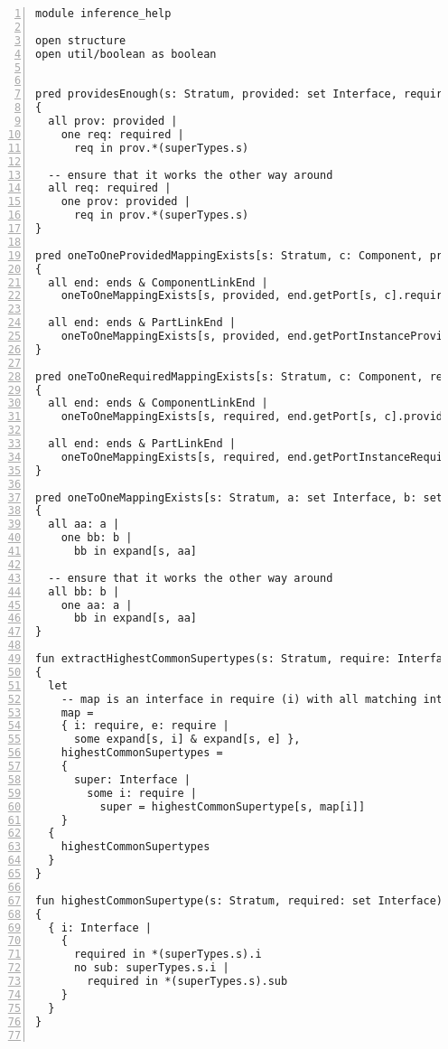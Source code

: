 \lstset{frame=tb, aboveskip=12pt, belowskip=-3pt, breaklines=true, basicstyle=\tiny\ttfamily, tabsize=2, mathescape=true}
\begin{lstlisting}[caption={inference\_help.als}, numbers=left]
module inference_help

open structure
open util/boolean as boolean


pred providesEnough(s: Stratum, provided: set Interface, required: set Interface)
{
  all prov: provided |
    one req: required |
      req in prov.*(superTypes.s)
      
  -- ensure that it works the other way around
  all req: required |
    one prov: provided |
      req in prov.*(superTypes.s)
}

pred oneToOneProvidedMappingExists[s: Stratum, c: Component, provided: set Interface, ends: LinkEnd]
{
  all end: ends & ComponentLinkEnd |
    oneToOneMappingExists[s, provided, end.getPort[s, c].required.c.s]

  all end: ends & PartLinkEnd |
    oneToOneMappingExists[s, provided, end.getPortInstanceProvided[s, c]]
}

pred oneToOneRequiredMappingExists[s: Stratum, c: Component, required: set Interface, ends: LinkEnd]
{
  all end: ends & ComponentLinkEnd |
    oneToOneMappingExists[s, required, end.getPort[s, c].provided.c.s]

  all end: ends & PartLinkEnd |
    oneToOneMappingExists[s, required, end.getPortInstanceRequired[s, c]]
}

pred oneToOneMappingExists[s: Stratum, a: set Interface, b: set Interface]
{
  all aa: a |
    one bb: b |
      bb in expand[s, aa]
      
  -- ensure that it works the other way around
  all bb: b |
    one aa: a |
      bb in expand[s, aa]
}

fun extractHighestCommonSupertypes(s: Stratum, require: Interface): set Interface
{
  let
    -- map is an interface in require (i) with all matching interfaces in require (e)
    map =
    { i: require, e: require |
      some expand[s, i] & expand[s, e] },
    highestCommonSupertypes =
    {
      super: Interface |
        some i: require |
          super = highestCommonSupertype[s, map[i]]
    }
  {
    highestCommonSupertypes
  }
}

fun highestCommonSupertype(s: Stratum, required: set Interface): lone Interface
{
  { i: Interface |
    {
      required in *(superTypes.s).i
      no sub: superTypes.s.i |
        required in *(superTypes.s).sub
    }
  }
}


\end{lstlisting}

